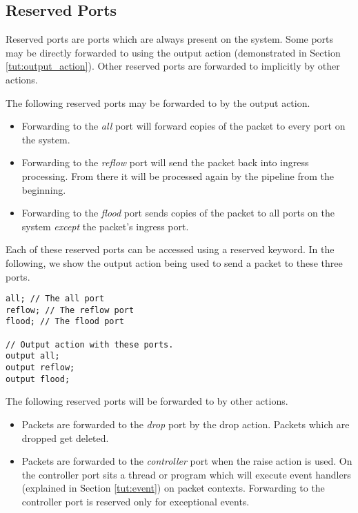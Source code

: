 \subsection {Reserved Ports} \label{tut:reserved_ports}

Reserved ports are ports which are always present on the system. Some ports may
be directly forwarded to using the output action (demonstrated in Section
\ref{tut:output_action}). Other reserved ports are forwarded to implicitly by
other actions.

The following reserved ports may be forwarded to by the output action.

\begin{itemize}
\item Forwarding to the \textit{all} port will forward copies of the packet to
every port on the system.

\item Forwarding to the \textit{reflow} port will send the packet back into
ingress processing. From there it will be processed again by the pipeline from
the beginning.

\item Forwarding to the \textit{flood} port sends copies of the packet to all
ports on the system \textit{except} the packet's ingress port.
\end{itemize}

Each of these reserved ports can be accessed using a reserved keyword. In the
following, we show the output action being used to send a packet to these three
ports.

\begin{codepage}
\begin{lstlisting}
all; // The all port
reflow; // The reflow port
flood; // The flood port

// Output action with these ports.
output all;
output reflow;
output flood;
\end{lstlisting}
\end{codepage}

The following reserved ports will be forwarded to by other actions.

\begin{itemize}
\item Packets are forwarded to the \textit{drop} port by the drop action.
Packets which are dropped get deleted.

\item Packets are forwarded to the \textit{controller} port when the raise
action is used. On the controller port sits a thread or program which will
execute event handlers (explained in Section \ref{tut:event}) on packet
contexts. Forwarding to the controller port is reserved only for exceptional
events.
\end{itemize}

